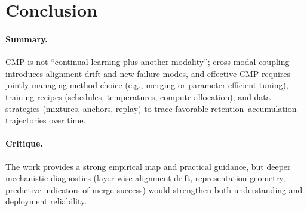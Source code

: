 \documentclass[12pt]{article}
\begin{document}
\section{Conclusion}
\paragraph{Summary.} CMP is not “continual learning plus another modality”; cross-modal coupling introduces
alignment drift and new failure modes, and effective CMP requires jointly managing method choice (e.g.,
merging or parameter-efficient tuning), training recipes (schedules, temperatures, compute allocation), and
data strategies (mixtures, anchors, replay) to trace favorable retention--accumulation trajectories over time.
\paragraph{Critique.} The work provides a strong empirical map and practical guidance, but deeper mechanistic
diagnostics (layer-wise alignment drift, representation geometry, predictive indicators of merge success)
would strengthen both understanding and deployment reliability.
\end{document}
